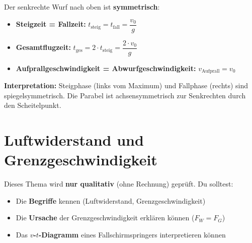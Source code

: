 \documentclass[11pt, a4paper]{article}
\begin{document}
\begin{merksatz}[title=Symmetrie des senkrechten Wurfs]
Der senkrechte Wurf nach oben ist \textbf{symmetrisch}:
\begin{itemize}[leftmargin=1em]
    \item \textbf{Steigzeit = Fallzeit:} $t_{\text{steig}} = t_{\text{fall}} = \dfrac{v_0}{g}$
    \item \textbf{Gesamtflugzeit:} $t_{\text{ges}} = 2 \cdot t_{\text{steig}} = \dfrac{2 \cdot v_0}{g}$
    \item \textbf{Aufprallgeschwindigkeit = Abwurfgeschwindigkeit:} $v_{\text{Aufprall}} = v_0$
\end{itemize}
\end{merksatz}

\begin{center}
\end{center}

\textbf{Interpretation:} Steigphase (links vom Maximum) und Fallphase (rechts) sind spiegelsymmetrisch. Die Parabel ist achsensymmetrisch zur Senkrechten durch den Scheitelpunkt.

\newpage


\section{Luftwiderstand und Grenzgeschwindigkeit}

\begin{warnbox}[title=Hinweis zur Klausur]
Dieses Thema wird \textbf{nur qualitativ} (ohne Rechnung) geprüft. Du solltest:
\begin{itemize}[leftmargin=1em]
    \item Die \textbf{Begriffe} kennen (Luftwiderstand, Grenzgeschwindigkeit)
    \item Die \textbf{Ursache} der Grenzgeschwindigkeit erklären können ($F_W = F_G$)
    \item Das \textbf{$v$-$t$-Diagramm} eines Fallschirmspringers interpretieren können
\end{itemize}
\end{warnbox}
\end{document}
